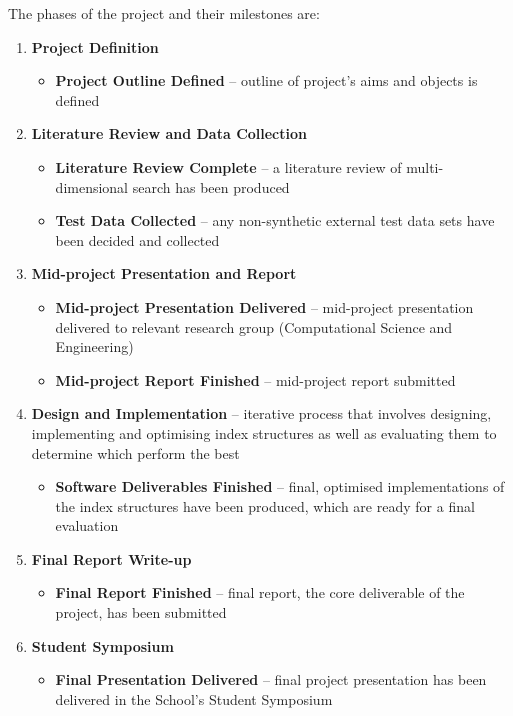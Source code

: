 The phases of the project and their milestones are:
\begin{enumerate}
	\item \textbf{Project Definition}
	\begin{itemize}
		\item \textbf{Project Outline Defined} -- outline of project's aims and objects is defined 
	\end{itemize}
	\item \textbf{Literature Review and Data Collection}
	\begin{itemize}	
		\item \textbf{Literature Review Complete} -- a literature review of multi-dimensional search has been produced
		\item \textbf{Test Data Collected} -- any non-synthetic external test data sets have been decided and collected
	\end{itemize}
	\item \textbf{Mid-project Presentation and Report}
	\begin{itemize}	
		\item \textbf{Mid-project Presentation Delivered} -- mid-project presentation delivered to relevant research group (Computational Science and Engineering)
		\item \textbf{Mid-project Report Finished} --  mid-project report submitted
	\end{itemize}	
	\item \textbf{Design and Implementation} -- iterative process that involves designing, implementing and optimising index structures as well as evaluating them to determine which perform the best
	\begin{itemize}
		\item \textbf{Software Deliverables Finished} -- final, optimised implementations of the index structures have been produced, which are ready for a final evaluation
	\end{itemize}
	\item \textbf{Final Report Write-up}
	\begin{itemize}
		\item \textbf{Final Report Finished} -- final report, the core deliverable of the project, has been submitted
	\end{itemize}
	\item \textbf{Student Symposium}
	\begin{itemize}
		\item \textbf{Final Presentation Delivered} -- final project presentation has been delivered in the School's Student Symposium	
	\end{itemize}
\end{enumerate}

